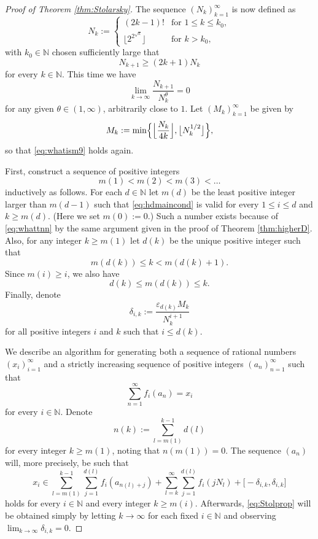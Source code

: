 \documentclass[11pt,letterpaper,reqno]{amsart}
\numberwithin{equation}{section}
\theoremstyle{definition}
\numberwithin{equation}{section}
\begin{document}
\begin{proof}[Proof of Theorem \ref{thm:Stolarsky}]
The sequence $(N_k)_{k=1}^{\infty}$ is now defined as
\[ N_k := \begin{cases}
(2k-1)! & \text{for } 1\leqslant k\leqslant k_0, \\
\big\lfloor 2^{2^{\sqrt{k}}} \big\rfloor & \text{for } k>k_0,
\end{cases} \]
with $k_0\in\mathbb{N}$ chosen sufficiently large that
\begin{equation}\label{eq:iwhatisn1}
N_{k+1} \geqslant (2k+1) N_k
\end{equation}
for every $k\in\mathbb{N}$.
This time we have
\begin{equation}\label{eq:whattnn}
\lim_{k\to\infty} \frac{N_{k+1}}{N_k^{\theta}} = 0
\end{equation}
for any given $\theta\in(1,\infty)$, arbitrarily close to $1$.
Let $(M_k)_{k=1}^{\infty}$ be given by
\[ M_k := \min\Bigl\{ \Big\lfloor\frac{N_k}{4k}\Big\rfloor , \big\lfloor N_k^{1/2}\big\rfloor \Bigr\}, \]
so that \eqref{eq:whatism9} holds again.

First, construct a sequence of positive integers
\[ m(1) < m(2) < m(3) < \ldots \]
inductively as follows.
For each $d\in\mathbb{N}$ let $m(d)$ be the least positive integer larger than $m(d-1)$ such that \eqref{eq:hdmaincond} is valid for every $1\leqslant i\leqslant d$ and $k\geqslant m(d)$. (Here we set $m(0):=0$.) Such a number exists because of \eqref{eq:whattnn} by the same argument given in the proof of Theorem \ref{thm:higherD}.
Also, for any integer $k\geqslant m(1)$ let $d(k)$ be the unique positive integer such that
\[ m(d(k))\leqslant k<m(d(k)+1). \]
Since $m(i)\geqslant i$, we also have
\begin{equation}\label{eq:lessthani}
d(k) \leqslant m(d(k))\leqslant k.
\end{equation}
Finally, denote
\[ \delta_{i,k} := \frac{\varepsilon_{d(k)} M_k}{N_k^{i+1}} \]
for all positive integers $i$ and $k$ such that $i\leqslant d(k)$.

We describe an algorithm for generating both a sequence of rational numbers $(x_i)_{i=1}^{\infty}$ and a strictly increasing sequence of positive integers $(a_n)_{n=1}^{\infty}$ such that
\begin{equation}\label{eq:Stolprop}
\sum_{n=1}^{\infty} f_i(a_n)=x_i
\end{equation}
for every $i\in\mathbb{N}$.
Denote
\[ n(k) := \sum_{l=m(1)}^{k-1} d(l) \]
for every integer $k\geqslant m(1)$, noting that $n(m(1))=0$.
The sequence $(a_n)$ will, more precisely, be such that
\begin{equation}\label{eq:infinduction}
x_i \in \sum_{l=m(1)}^{k-1} \sum_{j=1}^{d(l)} f_i(a_{n(l)+j}) + \sum_{l=k}^{\infty} \sum_{j=1}^{d(l)} f_i(j N_l) + \big[-\delta_{i,k},\delta_{i,k}\big]
\end{equation}
holds for every $i\in\mathbb{N}$ and every integer $k\geqslant m(i)$.
Afterwards, \eqref{eq:Stolprop} will be obtained simply by letting $k\to\infty$ for each fixed $i\in\mathbb{N}$ and observing $\lim_{k\to\infty}\delta_{i,k}=0$.


\end{proof}
\end{document}
